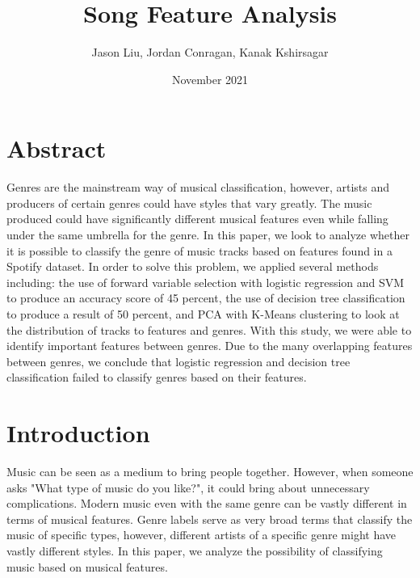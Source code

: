 \documentclass[11pt, a4paper, twocolumn]{article}
\title{Song Feature Analysis}
\author{Jason Liu, Jordan Conragan, Kanak Kshirsagar}
\date{November 2021}
\begin{document}
\maketitle
\section{Abstract}
Genres are the mainstream way of musical classification, however, artists and producers of certain genres could have styles that vary greatly. The music produced could have significantly different musical features even while falling under the same umbrella for the genre. In this paper, we look to analyze whether it is possible to classify the genre of music tracks based on features found in a Spotify dataset. In order to solve this problem, we applied several methods including: the use of forward variable selection with logistic regression and SVM to produce an accuracy score of 45 percent, the use of decision tree classification to produce a result of 50 percent, and PCA with K-Means clustering to look at the distribution of tracks to features and genres. With this study, we were able to identify important features between genres. Due to the many overlapping features between genres, we conclude that logistic regression and decision tree classification failed to classify genres based on their features. 
\section{Introduction}	
Music can be seen as a medium to bring people together. However, when someone asks "What type of music do you like?", it could bring about unnecessary complications. Modern music even with the same genre can be vastly different in terms of musical features. Genre labels serve as very broad terms that classify the music of specific types, however, different artists of a specific genre might have vastly different styles. In this paper, we analyze the possibility of classifying music based on musical features.
\end{document}
